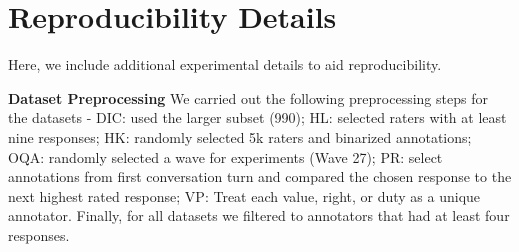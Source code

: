\documentclass[11pt]{article}
\begin{document}
% 


\section{Reproducibility Details}
\label{app:reproducibility}


Here, we include additional experimental details to aid reproducibility.

\textbf{Dataset Preprocessing}
We carried out the following preprocessing steps for the datasets -
DIC: used the larger subset (990);
HL: selected raters with at least nine responses;
HK: randomly selected 5k raters and binarized annotations;
OQA: randomly selected a wave for experiments (Wave 27);
PR: select annotations from first conversation turn and compared the chosen response to the next highest rated response;
VP: Treat each value, right, or duty as a unique annotator.
Finally, for all datasets we filtered to annotators that had at least four responses.
\end{document}
